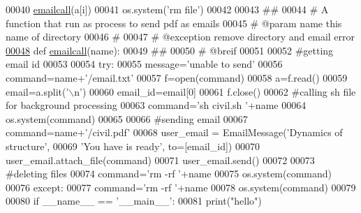\begin{DoxyCode}
00040         \hyperlink{namespaceinitial__file_ad9d26ace18fc618ee70df3c0c94927b7}{emailcall}(a[i])
00041     os.system(\textcolor{stringliteral}{'rm file'})
00042 
00043 \textcolor{comment}{##}
00044 \textcolor{comment}{# A function that run as process to send pdf as emails}
00045 \textcolor{comment}{# @param name this name of directory}
00046 \textcolor{comment}{#}
00047 \textcolor{comment}{# @exception remove directory and email error}
\hypertarget{initial__file_8py_source_l00048}{}\hyperlink{namespaceinitial__file_ad9d26ace18fc618ee70df3c0c94927b7}{00048} \textcolor{keyword}{def }\hyperlink{namespaceinitial__file_ad9d26ace18fc618ee70df3c0c94927b7}{emailcall}(name):
00049     \textcolor{comment}{##}
00050     \textcolor{comment}{# @breif}
00051 
00052     \textcolor{comment}{#getting email id}
00053 
00054     \textcolor{keywordflow}{try}:
00055                 message=\textcolor{stringliteral}{'unable to send'}
00056                 command=name+\textcolor{stringliteral}{'/email.txt'}
00057                 f=open(command)
00058                 a=f.read()
00059                 email=a.split(\textcolor{stringliteral}{'\(\backslash\)n'})
00060                 email\_id=email[0]
00061                 f.close()
00062         \textcolor{comment}{#calling sh file for background processing}
00063         command=\textcolor{stringliteral}{'sh civil.sh '}+name
00064         os.system(command)
00065 
00066         \textcolor{comment}{#sending email}
00067         command=name+\textcolor{stringliteral}{'/civil.pdf'}
00068         user\_email = EmailMessage(\textcolor{stringliteral}{'Dynamics of structure'},
00069         \textcolor{stringliteral}{'You have is ready'}, to=[email\_id])
00070         user\_email.attach\_file(command)
00071         user\_email.send()
00072 
00073         \textcolor{comment}{#deleting files}
00074         command=\textcolor{stringliteral}{'rm -rf '}+name
00075         os.system(command)
00076     \textcolor{keywordflow}{except}:
00077                 command=\textcolor{stringliteral}{'rm -rf '}+name
00078                 os.system(command)
00079 
00080 \textcolor{keywordflow}{if} \_\_name\_\_ == \textcolor{stringliteral}{'\_\_main\_\_'}:
00081     print(\textcolor{stringliteral}{"hello"})
\end{DoxyCode}
